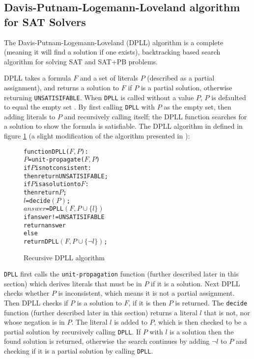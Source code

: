 \subsection{Davis-Putnam-Logemann-Loveland algorithm for SAT Solvers}
The Davis-Putnam-Logemann-Loveland (DPLL) algorithm \citep{Davis1960, davis1962machine} is a complete (meaning it will find a solution if one exists), 
backtracking based search algorithm for solving SAT and SAT+PB problems.


DPLL takes a formula $F$ and a set of literals $P$ (described as a partial assignment), and returns a solution to $F$ if $P$ is a partial solution, 
otherwise returning \verb+UNSATISIFABLE+.
When \texttt{DPLL} is called without a value $P$, $P$ is defaulted to equal the empty set .
By first calling \texttt{DPLL} with $P$ as the empty set, then adding literals to $P$ and recursively calling itself; 
the DPLL function searches for a solution to show the formula is satisfiable.
The DPLL algorithm in defined in figure \ref{impl.DPLL} (a slight modification of the algorithm presented in \citep{dixon2004automating}):
\begin{figure}[h]
\begin{center}
\begin{alltt}
function DPLL(\(F, P\)):
   \(P\) = unit-propagate(\(F, P\))
   if \(P\) is not consistent:
       then return UNSATISIFABLE;
   if \(P\) is a solution to \(F\):
       then return \(P\);
   \(l\) = decide\((P)\);
   \(answer\) = DPLL\((F, P \cup \{l\})\)
   if answer != UNSATISIFABLE 
       return answer
   else
       return DPLL\((F, P \cup \{\neg l\})\);
\end{alltt}
  \caption{Recursive DPLL algorithm}
  \label{impl.DPLL}
\end{center}
\end{figure}

\texttt{DPLL} first calls the \texttt{unit-propagation} function (further described later in this section) which derives literals that must be in $P$ if it is a solution.
Next DPLL checks whether $P$ is inconsistent, which means it is not a partial assignment.
Then DPLL checks if $P$ is a solution to $F$, if it is then $P$ is returned.
The \texttt{decide} function (further described later in this section) returns a literal $l$ that is not, nor whose negation is in $P$.
The literal $l$ is added to $P$, which is then checked to be a partial solution by recursively calling \texttt{DPLL}.
If $P$ with $l$ is a solution then the found solution is returned,
otherwise the search continues by adding $\neg l$ to $P$ and checking if it is a partial solution by calling \texttt{DPLL}.

